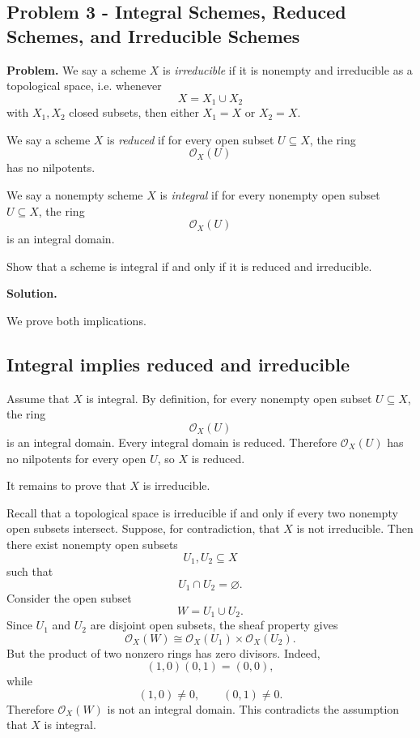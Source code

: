 
\subsection*{Problem 3 - Integral Schemes, Reduced Schemes, and Irreducible Schemes}

\textbf{Problem.}
We say a scheme \(X\) is \emph{irreducible} if it is nonempty and irreducible as a topological space, i.e. whenever
\[
X=X_1\cup X_2
\]
with \(X_1,X_2\) closed subsets, then either \(X_1=X\) or \(X_2=X\).

We say a scheme \(X\) is \emph{reduced} if for every open subset \(U\subseteq X\), the ring
\[
\mathcal O_X(U)
\]
has no nilpotents.

We say a nonempty scheme \(X\) is \emph{integral} if for every nonempty open subset \(U\subseteq X\), the ring
\[
\mathcal O_X(U)
\]
is an integral domain.

Show that a scheme is integral if and only if it is reduced and irreducible.

\textbf{Solution.}

We prove both implications.

\subsection*{Integral implies reduced and irreducible}

Assume that \(X\) is integral. By definition, for every nonempty open subset \(U\subseteq X\), the ring
\[
\mathcal O_X(U)
\]
is an integral domain. Every integral domain is reduced. Therefore \(\mathcal O_X(U)\) has no nilpotents for every open \(U\), so \(X\) is reduced.

It remains to prove that \(X\) is irreducible.

Recall that a topological space is irreducible if and only if every two nonempty open subsets intersect. Suppose, for contradiction, that \(X\) is not irreducible. Then there exist nonempty open subsets
\[
U_1,U_2\subseteq X
\]
such that
\[
U_1\cap U_2=\varnothing.
\]
Consider the open subset
\[
W=U_1\cup U_2.
\]
Since \(U_1\) and \(U_2\) are disjoint open subsets, the sheaf property gives
\[
\mathcal O_X(W)
\cong
\mathcal O_X(U_1)\times \mathcal O_X(U_2).
\]
But the product of two nonzero rings has zero divisors. Indeed,
\[
(1,0)(0,1)=(0,0),
\]
while
\[
(1,0)\neq 0,
\qquad
(0,1)\neq 0.
\]
Therefore \(\mathcal O_X(W)\) is not an integral domain. This contradicts the assumption that \(X\) is integral.

